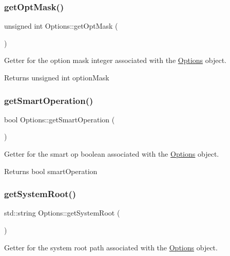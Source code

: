 \subsubsection{\texorpdfstring{getOptMask()}{getOptMask()}}
{\footnotesize\ttfamily unsigned int Options\+::get\+Opt\+Mask (\begin{DoxyParamCaption}{ }\end{DoxyParamCaption})}



Getter for the option mask integer associated with the \mbox{\hyperlink{classOptions}{Options}} object. 

\begin{DoxyReturn}{Returns}
unsigned int option\+Mask 
\end{DoxyReturn}
\mbox{\label{classOptions_a84ce0e1b99886d39ca63725c4f270e68}} 
\subsubsection{\texorpdfstring{getSmartOperation()}{getSmartOperation()}}
{\footnotesize\ttfamily bool Options\+::get\+Smart\+Operation (\begin{DoxyParamCaption}{ }\end{DoxyParamCaption})}



Getter for the smart op boolean associated with the \mbox{\hyperlink{classOptions}{Options}} object. 

\begin{DoxyReturn}{Returns}
bool smart\+Operation 
\end{DoxyReturn}
\mbox{\label{classOptions_af9328ba8e2769b496e7866e2ca6594e0}} 
\subsubsection{\texorpdfstring{getSystemRoot()}{getSystemRoot()}}
{\footnotesize\ttfamily std\+::string Options\+::get\+System\+Root (\begin{DoxyParamCaption}{ }\end{DoxyParamCaption})}



Getter for the system root path associated with the \mbox{\hyperlink{classOptions}{Options}} object. 

